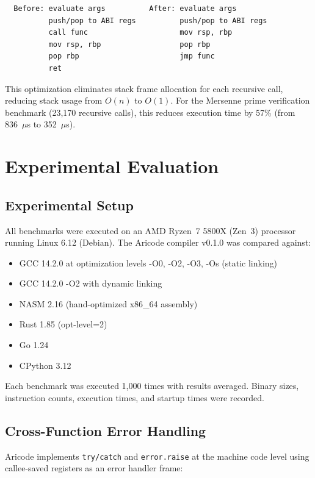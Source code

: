 \documentclass[11pt,a4paper]{article}
\begin{document}
\begin{verbatim}
  Before: evaluate args          After: evaluate args
          push/pop to ABI regs          push/pop to ABI regs
          call func                     mov rsp, rbp
          mov rsp, rbp                  pop rbp
          pop rbp                       jmp func
          ret
\end{verbatim}

This optimization eliminates stack frame allocation for each recursive call, reducing stack usage from $O(n)$ to $O(1)$. For the Mersenne prime verification benchmark (23,170 recursive calls), this reduces execution time by 57\% (from 836~$\mu$s to 352~$\mu$s).

\section{Experimental Evaluation}
\label{sec:eval}

\subsection{Experimental Setup}

All benchmarks were executed on an AMD Ryzen~7 5800X (Zen~3) processor running Linux 6.12 (Debian). The Aricode compiler v0.1.0 was compared against:

\begin{itemize}
    \item GCC 14.2.0 at optimization levels -O0, -O2, -O3, -Os (static linking)
    \item GCC 14.2.0 -O2 with dynamic linking
    \item NASM 2.16 (hand-optimized x86\_64 assembly)
    \item Rust 1.85 (opt-level=2)
    \item Go 1.24
    \item CPython 3.12
\end{itemize}

Each benchmark was executed 1,000 times with results averaged. Binary sizes, instruction counts, execution times, and startup times were recorded.

\subsection{Cross-Function Error Handling}

Aricode implements \texttt{try/catch} and \texttt{error.raise} at the machine code level using callee-saved registers as an error handler frame:
\end{document}
